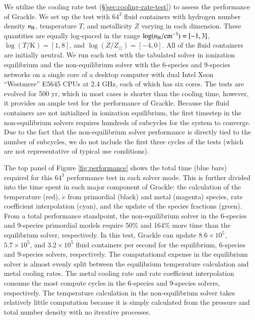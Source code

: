 We utilize the cooling rate test (\S\ref{sec:cooling-rate-test}) to
assess the performance of Grackle.  We set up the test with $64^3$
fluid containers with hydrogen number density $n_{\rm H}$, temperature
$T$, and metallicity $Z$ varying in each dimension.  These quantities
are equally log-spaced in the range $\log (n_{\rm H} /
\textrm{cm}^{-3}) = [-1, 3]$, $\log (T/\textrm{K}) = [1, 8]$, and
$\log (Z/Z_\odot) = [-4, 0]$.  All of the fluid containers are
initially neutral.  We run each test with the tabulated solver in
ionization equilibrium and the non-equilibrium solver with the
6-species and 9-species networks on a single core of a desktop
computer with dual Intel Xeon ``Westmere'' E5645 CPUs at 2.4 GHz, each
of which has six cores.  The tests are evolved for 500 yr, which in
most cases is shorter than the cooling time, however, it provides an
ample test for the performance of Grackle.  Because the fluid
containers are not initialized in ionization equilibrium, the first
timestep in the non-equilibrium solvers requires hundreds of subcycles
for the system to converge.  Due to the fact that the non-equilibrium solver
performance is directly tied to the number of subcycles, we do not
include the first three cycles of the tests (which are not representative of
typical use conditions).


The top panel of Figure \ref{fig:performance} shows the total time
(blue bars) required for this $64^3$ performance test in each solver
mode.  This is further divided into the time spent in each major
component of Grackle: the calculation of the temperature (red),
$\dot{e}$ from primordial (black) and metal (magenta) species, rate
coefficient interpolation (cyan), and the update of the species
fractions (green).  From a total performance standpoint, the
non-equilibrium solver in the 6-species and 9-species primordial
models require 50\% and 164\% more time than the equilibrium solver,
respectively.  In this test, Grackle can update $8.6 \times 10^5$,
$5.7 \times 10^5$, and $3.2 \times 10^5$ fluid containers per second
for the equilibrium, 6-species and 9-species solvers, respectively.
The computational expense in the equilibrium solver is almost evenly
split between the equilibrium temperature calculation and metal
cooling rates.  The metal cooling rate and rate coefficient
interpolation consume the most compute cycles in the 6-species and
9-species solvers, respectively.  The temperature calculation in the
non-equilibrium solver takes relatively little computation because it
is simply calculated from the pressure and total number density with
no iterative processes.

